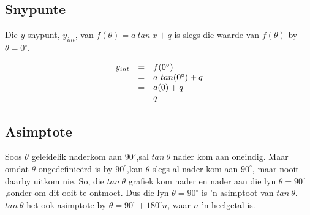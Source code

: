 \subsection*{Snypunte}
\nopagebreak
Die $y$-snypunt, ${y}_{int}$, van $f(\theta )=a~tan~x+q$ is slegs die waarde van $f(\theta )$ by $\theta ={0}^{\circ }$.\par 
\nopagebreak\noindent{}
\begin{equation*}
\begin{array}{ccc}\hfill {y}_{int}& =& f({0}^{\circ })\hfill \\
 & =& a~tan({0}^{\circ })+q\hfill \\
 & =& a(0)+q\hfill \\
 & =& q\hfill 
\end{array}
\end{equation*}

\subsection*{Asimptote}
\nopagebreak
Soos $\theta $ geleidelik naderkom aan ${90}^{\circ }$,sal $tan~\theta $ nader kom aan oneindig. Maar omdat $\theta $ ongedefinieërd is by ${90}^{\circ }$,kan $\theta $ slegs al nader kom aan ${90}^{\circ }$, maar nooit daarby uitkom nie. So, die $tan~\theta $ grafiek kom nader en nader aan
die lyn  $\theta ={90}^{\circ }$,sonder om dit ooit te ontmoet. Dus die lyn $\theta ={90}^{\circ }$ is ’n asimptoot van $tan~\theta $. $tan~\theta $ het ook
asimptote by $\theta ={90}^{\circ }+{180}^{\circ }n$, waar $n$ ’n heelgetal is.\par 

